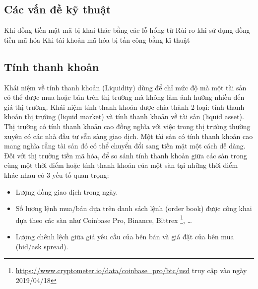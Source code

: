 \subsection{Các vấn đề kỹ thuật}
Khi đồng tiền mật mã bị khai thác bằng các lỗ hổng từ Rủi ro khi sử dụng đồng tiền mã hóa 
Khi tài khoản mã hóa bị tấn công bằng kĩ thuật 

\subsection{Tính thanh khoản}

Khái niệm về tính thanh khoản (Liquidity) dùng để chỉ mức độ mà một tài sản có thể được mua hoặc bán trên thị trường mà không làm ảnh hưởng nhiều đến giá thị trường.
Khái niệm tính thanh khoản được chia thành 2 loại: tính thanh khoản thị trường (liquid market) và tính thanh khoản về tài sản (liquid asset). Thị trường có tính thanh khoản cao đồng nghĩa với việc trong thị trường thường xuyên có các nhà đầu tư sẵn sàng giao dịch. Một tài sản có tính thanh khoản cao mang nghĩa rằng tài sản đó có thể chuyển đổi sang tiền mặt một cách dễ dàng. Đối với thị trường tiền mã hóa, để so sánh tính thanh khoản giữa các sàn trong cùng một thời điểm hoặc tính thanh khoản của một sàn tại những thời điểm khác nhau có 3 yếu tố quan trọng: 
\begin{itemize}
	\item Lượng đồng giao dịch trong ngày.
	\item Số lượng lệnh mua/bán dựa trên danh sách lệnh (order book) được công khai dựa theo các sàn như Coinbase Pro, Binance, Bittrex \footnote{\url{https://www.cryptometer.io/data/coinbase_pro/btc/usd} truy cập vào ngày 2019/04/18}, \dots
	\item Lượng chênh lệch giữa giá yêu cầu của bên bán và giá đặt của bên mua (bid/ask spread).
\end{itemize}

